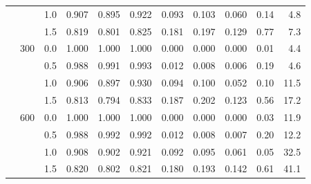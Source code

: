 \begin{table}[htbp]
\begin{tabular}{lllrrrrrrrr}
 &  & 1.0 & 0.907 & 0.895 & 0.922 & 0.093 & 0.103 & 0.060 & 0.14 & 4.8 \\
 &  & 1.5 & 0.819 & 0.801 & 0.825 & 0.181 & 0.197 & 0.129 & 0.77 & 7.3 \\
 & 300 & 0.0 & 1.000 & 1.000 & 1.000 & 0.000 & 0.000 & 0.000 & 0.01 & 4.4 \\
 &  & 0.5 & 0.988 & 0.991 & 0.993 & 0.012 & 0.008 & 0.006 & 0.19 & 4.6 \\
 &  & 1.0 & 0.906 & 0.897 & 0.930 & 0.094 & 0.100 & 0.052 & 0.10 & 11.5 \\
 &  & 1.5 & 0.813 & 0.794 & 0.833 & 0.187 & 0.202 & 0.123 & 0.56 & 17.2 \\
 & 600 & 0.0 & 1.000 & 1.000 & 1.000 & 0.000 & 0.000 & 0.000 & 0.03 & 11.9 \\
 &  & 0.5 & 0.988 & 0.992 & 0.992 & 0.012 & 0.008 & 0.007 & 0.20 & 12.2 \\
 &  & 1.0 & 0.908 & 0.902 & 0.921 & 0.092 & 0.095 & 0.061 & 0.05 & 32.5 \\
 &  & 1.5 & 0.820 & 0.802 & 0.821 & 0.180 & 0.193 & 0.142 & 0.61 & 41.1 \\
\bottomrule
\end{tabular}
\end{table}
